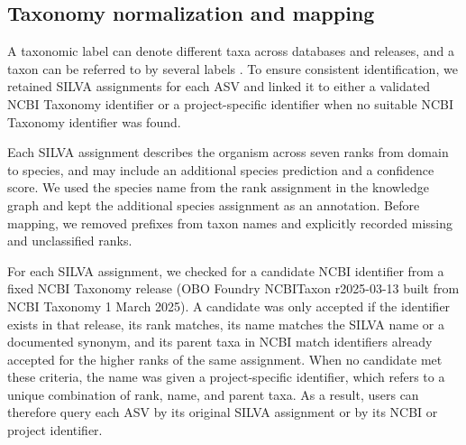 \subsection{Taxonomy normalization and mapping}
\label{methods:taxonomy}
A taxonomic label can denote different taxa across databases and releases, and a taxon can be referred to by several labels \cite{balvovciute2017silva}. To ensure consistent identification, we retained SILVA assignments for each ASV and linked it to either a validated NCBI Taxonomy identifier or a project-specific identifier when no suitable NCBI Taxonomy identifier was found.

Each SILVA assignment describes the organism across seven ranks from domain to species, and may include an additional species prediction and a confidence score. We used the species name from the rank assignment in the knowledge graph and kept the additional species assignment as an annotation. Before mapping, we removed prefixes from taxon names and explicitly recorded missing and unclassified ranks.

For each SILVA assignment, we checked for a candidate NCBI identifier from a fixed NCBI Taxonomy release (OBO Foundry NCBITaxon r2025-03-13 built from NCBI Taxonomy 1 March 2025). A candidate was only accepted if the identifier exists in that release, its rank matches, its name matches the SILVA name or a documented synonym, and its parent taxa in NCBI match identifiers already accepted for the higher ranks of the same assignment. When no candidate met these criteria, the name was given a project-specific identifier, which refers to a unique combination of rank, name, and parent taxa. As a result, users can therefore query each ASV by its original SILVA assignment or by its NCBI or project identifier.




